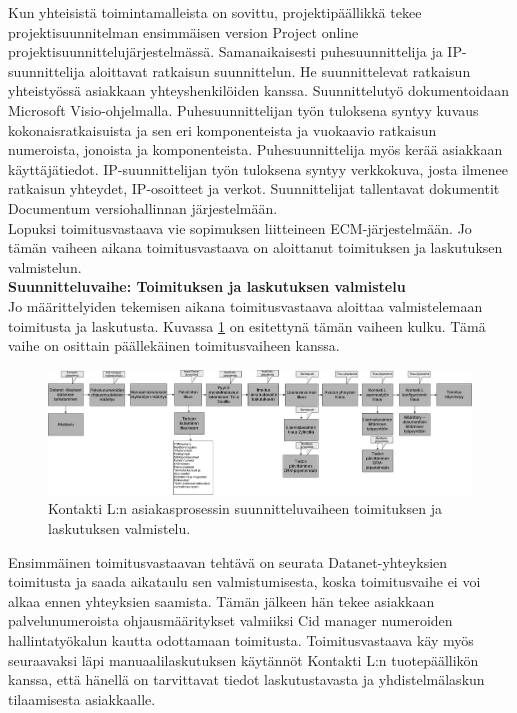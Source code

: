 \documentclass[finnish,12pt,a4paper,pdftex]{article}
\begin{document}
Kun yhteisistä toimintamalleista on sovittu, projektipäällikkä tekee projektisuunnitelman ensimmäisen version Project online projektisuunnittelujärjestelmässä. Samanaikaisesti puhesuunnittelija ja IP-suunnittelija aloittavat ratkaisun suunnittelun. He suunnittelevat ratkaisun yhteistyössä asiakkaan yhteyshenkilöiden kanssa. Suunnittelutyö dokumentoidaan Microsoft Visio-ohjelmalla. Puhesuunnittelijan työn tuloksena syntyy kuvaus kokonaisratkaisuista ja sen eri komponenteista ja vuokaavio ratkaisun numeroista, jonoista ja komponenteista. Puhesuunnittelija myös kerää asiakkaan käyttäjätiedot. IP-suunnittelijan työn tuloksena syntyy verkkokuva, josta ilmenee ratkaisun yhteydet, IP-osoitteet ja verkot. Suunnittelijat tallentavat dokumentit Documentum versiohallinnan järjestelmään.\\

Lopuksi toimitusvastaava vie sopimuksen liitteineen ECM-järjestelmään. Jo tämän vaiheen aikana toimitusvastaava on aloittanut toimituksen ja laskutuksen valmistelun.\\ 

\textbf{Suunnitteluvaihe: Toimituksen ja laskutuksen valmistelu}\\

Jo määrittelyiden tekemisen aikana toimitusvastaava aloittaa valmistelemaan toimitusta ja laskutusta. Kuvassa \ref{fig:valmtoimlask} on esitettynä tämän vaiheen kulku. Tämä vaihe on osittain päällekäinen toimitusvaiheen kanssa.

\begin{figure}[!h]
    \centering
    \includegraphics[scale=0.2]{images/valmtoimlask.pdf}
    \caption{Kontakti L:n asiakasprosessin suunnitteluvaiheen toimituksen ja laskutuksen valmistelu.}
    \label{fig:valmtoimlask}
\end{figure}

Ensimmäinen toimitusvastaavan tehtävä on seurata Datanet-yhteyksien toimitusta ja saada aikataulu sen valmistumisesta, koska toimitusvaihe ei voi alkaa ennen yhteyksien saamista. Tämän jälkeen hän tekee asiakkaan palvelunumeroista ohjausmääritykset valmiiksi Cid manager numeroiden hallintatyökalun kautta odottamaan toimitusta. Toimitusvastaava käy myös seuraavaksi läpi manuaalilaskutuksen käytännöt Kontakti L:n tuotepäällikön kanssa, että hänellä on tarvittavat tiedot laskutustavasta ja yhdistelmälaskun tilaamisesta asiakkaalle.\\
\end{document}
